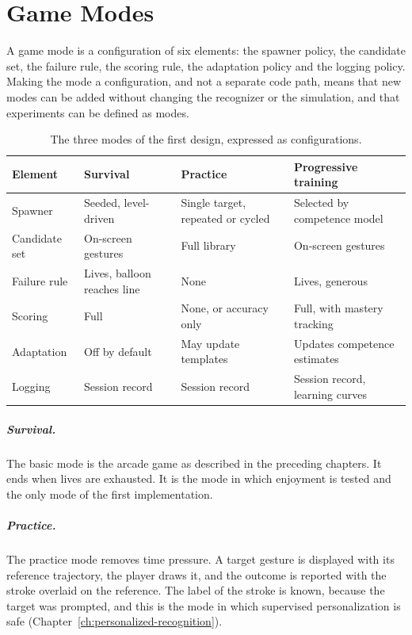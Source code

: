 \chapter{Game Modes}\label{ch:modes}

A game mode is a configuration of six elements: the spawner policy, the candidate set, the failure rule, the scoring rule, the adaptation policy and the logging policy. Making the mode a configuration, and not a separate code path, means that new modes can be added without changing the recognizer or the simulation, and that experiments can be defined as modes.

\begin{table}[t]
\centering
\small
\begin{tabularx}{\textwidth}{@{}lXXX@{}}
\toprule
Element & Survival & Practice & Progressive training \\
\midrule
Spawner & Seeded, level-driven & Single target, repeated or cycled & Selected by competence model \\
Candidate set & On-screen gestures & Full library & On-screen gestures \\
Failure rule & Lives, balloon reaches line & None & Lives, generous \\
Scoring & Full & None, or accuracy only & Full, with mastery tracking \\
Adaptation & Off by default & May update templates & Updates competence estimates \\
Logging & Session record & Session record & Session record, learning curves \\
\bottomrule
\end{tabularx}
\caption{The three modes of the first design, expressed as configurations.}
\label{tab:modes}
\end{table}

\paragraph{Survival.} The basic mode is the arcade game as described in the preceding chapters. It ends when lives are exhausted. It is the mode in which enjoyment is tested and the only mode of the first implementation.

\paragraph{Practice.} The practice mode removes time pressure. A target gesture is displayed with its reference trajectory, the player draws it, and the outcome is reported with the stroke overlaid on the reference. The label of the stroke is known, because the target was prompted, and this is the mode in which supervised personalization is safe (Chapter~\ref{ch:personalized-recognition}).

